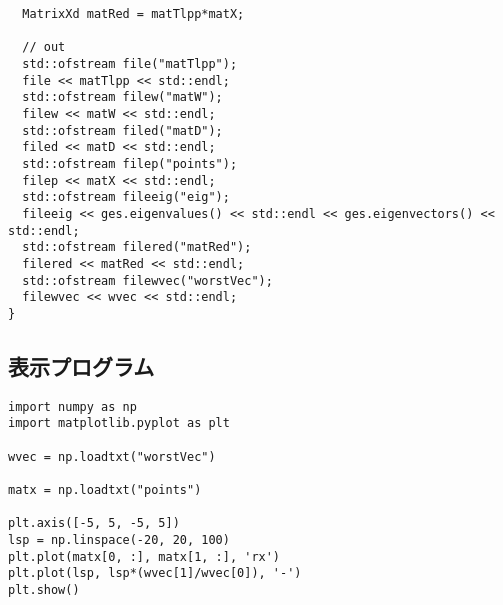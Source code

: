 \documentclass[9pt]{ltjsarticle}
\begin{document}
\begin{verbatim}
  MatrixXd matRed = matTlpp*matX;

  // out
  std::ofstream file("matTlpp");
  file << matTlpp << std::endl;
  std::ofstream filew("matW");
  filew << matW << std::endl;
  std::ofstream filed("matD");
  filed << matD << std::endl;
  std::ofstream filep("points");
  filep << matX << std::endl;
  std::ofstream fileeig("eig");
  fileeig << ges.eigenvalues() << std::endl << ges.eigenvectors() << std::endl;
  std::ofstream filered("matRed");
  filered << matRed << std::endl;
  std::ofstream filewvec("worstVec");
  filewvec << wvec << std::endl;
}
\end{verbatim}
\normalsize
\subsection*{表示プログラム}
\tiny
\begin{verbatim}
import numpy as np
import matplotlib.pyplot as plt

wvec = np.loadtxt("worstVec")

matx = np.loadtxt("points")

plt.axis([-5, 5, -5, 5])
lsp = np.linspace(-20, 20, 100)
plt.plot(matx[0, :], matx[1, :], 'rx')     
plt.plot(lsp, lsp*(wvec[1]/wvec[0]), '-')  
plt.show()
\end{verbatim}

\normalsize
\end{document}

